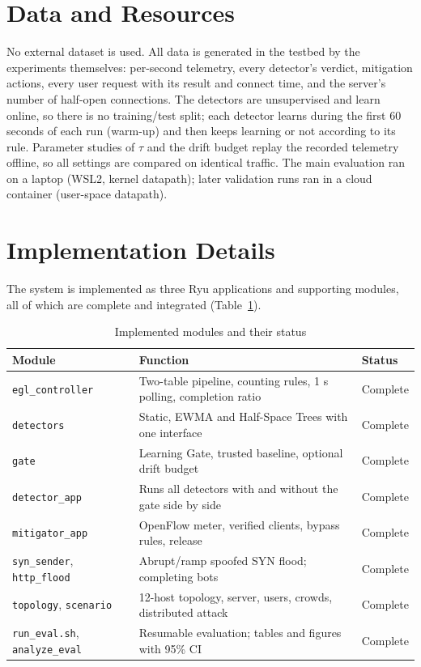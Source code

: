 \documentclass[12pt,a4paper,oneside]{report}
\begin{document}
\section{Data and Resources}
No external dataset is used. All data is generated in the testbed by the experiments themselves: per-second telemetry, every detector's verdict, mitigation actions, every user request with its result and connect time, and the server's number of half-open connections. The detectors are unsupervised and learn online, so there is no training/test split; each detector learns during the first 60 seconds of each run (warm-up) and then keeps learning or not according to its rule. Parameter studies of $\tau$ and the drift budget replay the recorded telemetry offline, so all settings are compared on identical traffic. The main evaluation ran on a laptop (WSL2, kernel datapath); later validation runs ran in a cloud container (user-space datapath).

\section{Implementation Details}
The system is implemented as three Ryu applications and supporting modules, all of which are complete and integrated (Table~\ref{tab:modules}).
\begin{table}[htbp]\centering\caption{Implemented modules and their status}\label{tab:modules}\begin{tabularx}{\textwidth}{lXl}\toprule Module & Function & Status\\\midrule
\texttt{egl\_controller} & Two-table pipeline, counting rules, 1 s polling, completion ratio & Complete\\
\texttt{detectors} & Static, EWMA and Half-Space Trees with one interface & Complete\\
\texttt{gate} & Learning Gate, trusted baseline, optional drift budget & Complete\\
\texttt{detector\_app} & Runs all detectors with and without the gate side by side & Complete\\
\texttt{mitigator\_app} & OpenFlow meter, verified clients, bypass rules, release & Complete\\
\texttt{syn\_sender}, \texttt{http\_flood} & Abrupt/ramp spoofed SYN flood; completing bots & Complete\\
\texttt{topology}, \texttt{scenario} & 12-host topology, server, users, crowds, distributed attack & Complete\\
\texttt{run\_eval.sh}, \texttt{analyze\_eval} & Resumable evaluation; tables and figures with 95\% CI & Complete\\
\bottomrule\end{tabularx}\end{table}
\end{document}
